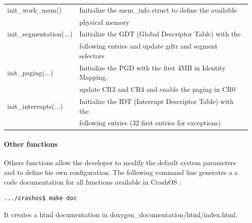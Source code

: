 \documentclass[12pt, openany]{report}
\begin{document}
\setlongtables
\begin{longtable}{|l | l |}
\hline
init\_work\_mem() 		& Initialize the mem\_info struct to define the available \\
						& physical memory\\
\hline
init\_segmentation(...)	& Initialize the GDT (Global Descriptor Table) with the \\
						& following entries and update gdtr and segment selectors\\
\hline
init\_paging(...) 		& Initialize the PGD with the first 4MB in Identity Mapping, \\
						& update CR3 and CR4 and enable the paging in CR0 \\
\hline
init\_interrupts(...) 	& Initialize the IDT (Interrupt Descriptor Table) with the\\ 
						& following entries (32 first entries for exceptions)\\
 \hline
\end{longtable}


\paragraph{Other functions}Others functions allow the developer to modify the default system parameters and to define his own configuration. The following command line generates a a code documentation for all functions available in CrashOS :
\begin{lstlisting}
.../crashos$ make doc
\end{lstlisting}
It creates a html documentation in doxygen\_documentation/html/index.html.
\end{document}

